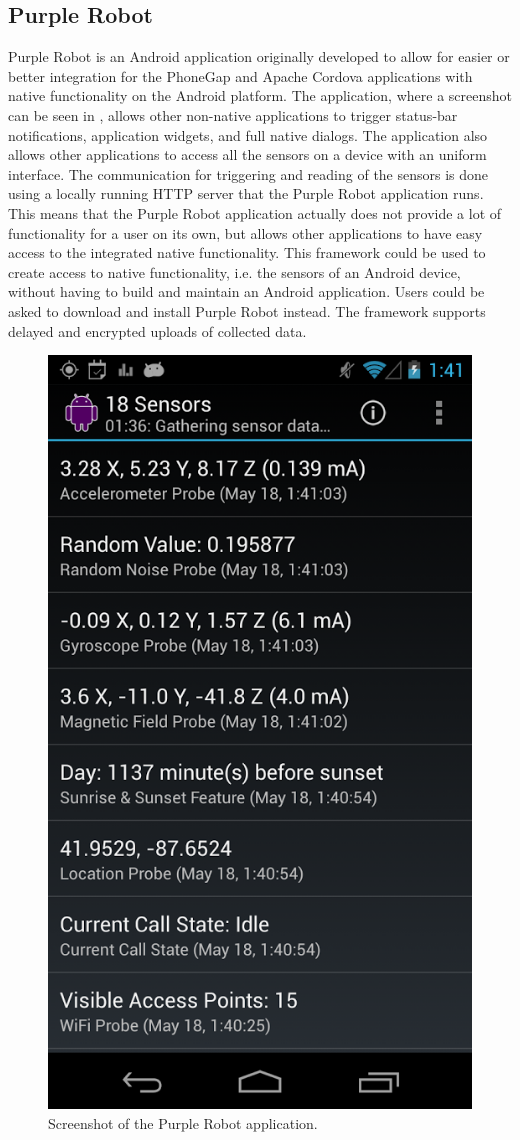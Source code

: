 \subsection{Purple Robot}
\label{sub:purple_robot}


Purple Robot \parencite{purple_robot} is an Android application originally developed to allow for easier or better integration for the PhoneGap and Apache Cordova applications with native functionality on the Android platform. The application, where a screenshot can be seen in , allows other non-native applications to trigger status-bar notifications, application widgets, and full native dialogs. The application also allows other applications to access all the sensors on a device with an uniform interface. The communication for triggering and reading of the sensors is done using a locally running HTTP server that the Purple Robot application runs. This means that the Purple Robot application actually does not provide a lot of functionality for a user on its own, but allows other applications to have easy access to the integrated native functionality. This framework could be used to create access to native functionality, i.e. the sensors of an Android device, without having to build and maintain an Android application. Users could be asked to download and install Purple Robot instead. The framework supports delayed and encrypted uploads of collected data. 

\begin{figure}[!htbp]
	\centering
	\includegraphics[height=0.5\textwidth]{graphic/existing_solutions/purple_robot.png}
	\caption[]{Screenshot of the Purple Robot application\footnotemark.}
	\label{fig:purple_robot_screenshot}
\end{figure}
\FloatBarrier
{}


